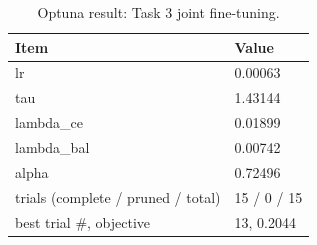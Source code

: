 \begin{table}[t]
\centering
\caption{Optuna result: Task 3 joint fine-tuning.}
\label{tab:optuna_moe_best}
\footnotesize
\begin{tabular}{ll}
\toprule
Item & Value \\
\midrule
lr & 0.00063 \\
tau & 1.43144 \\
lambda\_ce & 0.01899 \\
lambda\_bal & 0.00742 \\
alpha & 0.72496 \\
trials (complete / pruned / total) & 15 / 0 / 15 \\
best trial \#, objective & 13, 0.2044 \\
\bottomrule
\end{tabular}
\end{table}
